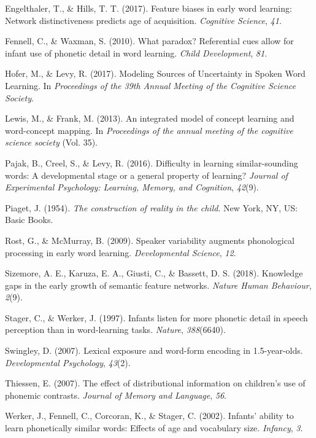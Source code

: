 \documentclass[10pt, letterpaper]{article}
\begin{document}
\hypertarget{ref-engelthaler2017}{}
Engelthaler, T., \& Hills, T. T. (2017). Feature biases in early word
learning: Network distinctiveness predicts age of acquisition.
\emph{Cognitive Science}, \emph{41}.

\hypertarget{ref-fennell2010}{}
Fennell, C., \& Waxman, S. (2010). What paradox? Referential cues allow
for infant use of phonetic detail in word learning. \emph{Child
Development}, \emph{81}.

\hypertarget{ref-hofer2017}{}
Hofer, M., \& Levy, R. (2017). Modeling Sources of Uncertainty in Spoken
Word Learning. In \emph{Proceedings of the 39th Annual Meeting of the
Cognitive Science Society}.

\hypertarget{ref-lewis2013}{}
Lewis, M., \& Frank, M. (2013). An integrated model of concept learning
and word-concept mapping. In \emph{Proceedings of the annual meeting of
the cognitive science society} (Vol. 35).

\hypertarget{ref-pajak2016}{}
Pajak, B., Creel, S., \& Levy, R. (2016). Difficulty in learning
similar-sounding words: A developmental stage or a general property of
learning? \emph{Journal of Experimental Psychology: Learning, Memory,
and Cognition}, \emph{42}(9).

\hypertarget{ref-piaget1954}{}
Piaget, J. (1954). \emph{The construction of reality in the child}. New
York, NY, US: Basic Books.

\hypertarget{ref-rost2009}{}
Rost, G., \& McMurray, B. (2009). Speaker variability augments
phonological processing in early word learning. \emph{Developmental
Science}, \emph{12}.

\hypertarget{ref-sizemore2018}{}
Sizemore, A. E., Karuza, E. A., Giusti, C., \& Bassett, D. S. (2018).
Knowledge gaps in the early growth of semantic feature networks.
\emph{Nature Human Behaviour}, \emph{2}(9).

\hypertarget{ref-stager1997}{}
Stager, C., \& Werker, J. (1997). Infants listen for more phonetic
detail in speech perception than in word-learning tasks. \emph{Nature},
\emph{388}(6640).

\hypertarget{ref-swingley2007}{}
Swingley, D. (2007). Lexical exposure and word-form encoding in
1.5-year-olds. \emph{Developmental Psychology}, \emph{43}(2).

\hypertarget{ref-thiessen2007}{}
Thiessen, E. (2007). The effect of distributional information on
children's use of phonemic contrasts. \emph{Journal of Memory and
Language}, \emph{56}.

\hypertarget{ref-werker2002}{}
Werker, J., Fennell, C., Corcoran, K., \& Stager, C. (2002). Infants'
ability to learn phonetically similar words: Effects of age and
vocabulary size. \emph{Infancy}, \emph{3}.
\end{document}
